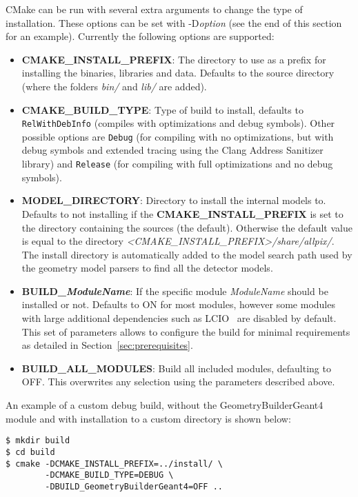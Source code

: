 CMake can be run with several extra arguments to change the type of installation.
These options can be set with -D\textit{option} (see the end of this section for an example).
Currently the following options are supported:
\begin{itemize}
\item \textbf{CMAKE\_INSTALL\_PREFIX}: The directory to use as a prefix for installing the binaries, libraries and data.
Defaults to the source directory (where the folders \textit{bin/} and \textit{lib/} are added). 
\item \textbf{CMAKE\_BUILD\_TYPE}: Type of build to install, defaults to \texttt{RelWithDebInfo} (compiles with optimizations and debug symbols).
Other possible options are \texttt{Debug} (for compiling with no optimizations, but with debug symbols and extended tracing using the Clang Address Sanitizer library) and \texttt{Release} (for compiling with full optimizations and no debug symbols). 
\item \textbf{MODEL\_DIRECTORY}: Directory to install the internal models to.
Defaults to not installing if the \textbf{CMAKE\_INSTALL\_PREFIX} is set to the directory containing the sources (the default).
Otherwise the default value is equal to the directory \textit{<CMAKE\_INSTALL\_PREFIX>/share/allpix/}.
The install directory is automatically added to the model search path used by the geometry model parsers to find all the detector models.
\item \textbf{BUILD\_\textit{ModuleName}}: If the specific module \textit{ModuleName} should be installed or not.
Defaults to ON for most modules, however some modules with large additional dependencies such as LCIO~\cite{lcio} are disabled by default.
This set of parameters allows to configure the build for minimal requirements as detailed in Section~\ref{sec:prerequisites}.
\item \textbf{BUILD\_ALL\_MODULES}: Build all included modules, defaulting to OFF.
This overwrites any selection using the parameters described above.
\end{itemize}

An example of a custom debug build, without the GeometryBuilderGeant4 module and with installation to a custom directory is shown below:
\begin{verbatim}
$ mkdir build
$ cd build
$ cmake -DCMAKE_INSTALL_PREFIX=../install/ \
        -DCMAKE_BUILD_TYPE=DEBUG \
        -DBUILD_GeometryBuilderGeant4=OFF ..
\end{verbatim}

